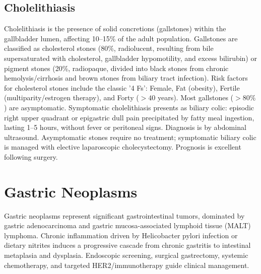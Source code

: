 \subsection{Cholelithiasis}
\label{sec:Cholelithiasis}
Cholelithiasis is the presence of solid concretions (gallstones) within the gallbladder lumen, affecting 10--15\% of the adult population. Gallstones are classified as cholesterol stones (80\%, radiolucent, resulting from bile supersaturated with cholesterol, gallbladder hypomotility, and excess bilirubin) or pigment stones (20\%, radiopaque, divided into black stones from chronic hemolysis/cirrhosis and brown stones from biliary tract infection). Risk factors for cholesterol stones include the classic '4 Fs': Female, Fat (obesity), Fertile (multiparity/estrogen therapy), and Forty ($>40$ years). Most gallstones ($>80\%$) are asymptomatic. Symptomatic cholelithiasis presents as biliary colic: episodic right upper quadrant or epigastric dull pain precipitated by fatty meal ingestion, lasting 1--5 hours, without fever or peritoneal signs. Diagnosis is by abdominal ultrasound. Asymptomatic stones require no treatment; symptomatic biliary colic is managed with elective laparoscopic cholecystectomy. Prognosis is excellent following surgery.


\section{Gastric Neoplasms}




Gastric neoplasms represent significant gastrointestinal tumors, dominated by gastric adenocarcinoma and gastric mucosa-associated lymphoid tissue (MALT) lymphoma. Chronic inflammation driven by Helicobacter pylori infection or dietary nitrites induces a progressive cascade from chronic gastritis to intestinal metaplasia and dysplasia. Endoscopic screening, surgical gastrectomy, systemic chemotherapy, and targeted HER2/immunotherapy guide clinical management.


